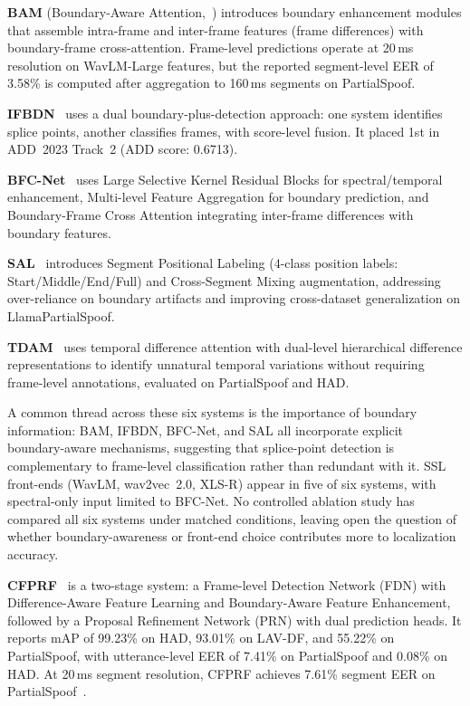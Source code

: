 \documentclass[journal]{IEEEtran}
\begin{document}
\textbf{BAM} (Boundary-Aware Attention,~\cite{zhong2024bam}) introduces boundary enhancement modules that assemble intra-frame and inter-frame features (frame differences) with boundary-frame cross-attention. Frame-level predictions operate at 20\,ms resolution on WavLM-Large features, but the reported segment-level EER of 3.58\% is computed after aggregation to 160\,ms segments on PartialSpoof.

\textbf{IFBDN}~\cite{cai2024ifbdn} uses a dual boundary-plus-detection approach: one system identifies splice points, another classifies frames, with score-level fusion. It placed 1st in ADD~2023 Track~2 (ADD score: 0.6713).

\textbf{BFC-Net}~\cite{zhou2025bfcnet} uses Large Selective Kernel Residual Blocks for spectral/temporal enhancement, Multi-level Feature Aggregation for boundary prediction, and Boundary-Frame Cross Attention integrating inter-frame differences with boundary features.

\textbf{SAL}~\cite{sal2026} introduces Segment Positional Labeling (4-class position labels: Start/Middle/End/Full) and Cross-Segment Mixing augmentation, addressing over-reliance on boundary artifacts and improving cross-dataset generalization on LlamaPartialSpoof.

\textbf{TDAM}~\cite{li2025tdam} uses temporal difference attention with dual-level hierarchical difference representations to identify unnatural temporal variations without requiring frame-level annotations, evaluated on PartialSpoof and HAD.

A common thread across these six systems is the importance of boundary information: BAM, IFBDN, BFC-Net, and SAL all incorporate explicit boundary-aware mechanisms, suggesting that splice-point detection is complementary to frame-level classification rather than redundant with it. SSL front-ends (WavLM, wav2vec~2.0, XLS-R) appear in five of six systems, with spectral-only input limited to BFC-Net. No controlled ablation study has compared all six systems under matched conditions, leaving open the question of whether boundary-awareness or front-end choice contributes more to localization accuracy.

\textbf{CFPRF}~\cite{wu2024cfprf} is a two-stage system: a Frame-level Detection Network (FDN) with Difference-Aware Feature Learning and Boundary-Aware Feature Enhancement, followed by a Proposal Refinement Network (PRN) with dual prediction heads. It reports mAP of 99.23\% on HAD, 93.01\% on LAV-DF, and 55.22\% on PartialSpoof, with utterance-level EER of 7.41\% on PartialSpoof and 0.08\% on HAD. At 20\,ms segment resolution, CFPRF achieves 7.61\% segment EER on PartialSpoof~\cite{luong2025metrics}.
\end{document}
